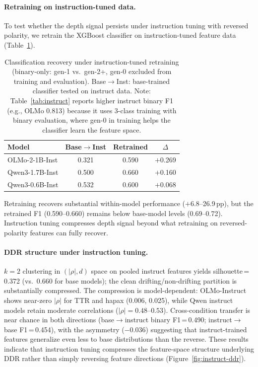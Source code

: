 \paragraph{Retraining on instruction-tuned data.}
To test whether the depth signal persists under instruction tuning with reversed polarity, we retrain the XGBoost classifier on instruction-tuned feature data (Table~\ref{tab:instruct-retrain}).

\begin{table}[ht]
\centering
\small
\caption{Classification recovery under instruction-tuned retraining (binary-only: gen-1 vs.\ gen-2+, gen-0 excluded from training and evaluation). Base$\rightarrow$Inst: base-trained classifier tested on instruct data. Note: Table~\ref{tab:instruct} reports higher instruct binary F1 (e.g., OLMo 0.813) because it uses 3-class training with binary evaluation, where gen-0 in training helps the classifier learn the feature space.}
\label{tab:instruct-retrain}
\begin{tabular}{lccc}
\toprule
\textbf{Model} & \textbf{Base$\rightarrow$Inst} & \textbf{Retrained} & \textbf{$\Delta$} \\
\midrule
OLMo-2-1B-Inst   & 0.321 & 0.590 & $+$0.269 \\
Qwen3-1.7B-Inst  & 0.500 & 0.660 & $+$0.160 \\
Qwen3-0.6B-Inst  & 0.532 & 0.600 & $+$0.068 \\
\bottomrule
\end{tabular}
\end{table}

Retraining recovers substantial within-model performance ($+$6.8--26.9\,pp), but the retrained F1 (0.590--0.660) remains below base-model levels (0.69--0.72). Instruction tuning compresses depth signal beyond what retraining on reversed-polarity features can fully recover.

\paragraph{DDR structure under instruction tuning.}
$k{=}2$ clustering in $(|\rho|, d)$ space on pooled instruct features yields silhouette\,=\,0.372 (vs.\ 0.660 for base models); the clean drifting/non-drifting partition is substantially compressed.
The compression is model-dependent: OLMo-Instruct shows near-zero $|\rho|$ for TTR and hapax (0.006, 0.025), while Qwen instruct models retain moderate correlations ($|\rho|{=}0.48$--$0.53$).
Cross-condition transfer is near chance in both directions (base$\rightarrow$instruct binary F1\,=\,0.490; instruct$\rightarrow$base F1\,=\,0.454), with the asymmetry ($-$0.036) suggesting that instruct-trained features generalize even less to base distributions than the reverse.
These results indicate that instruction tuning compresses the feature-space structure underlying DDR rather than simply reversing feature directions (Figure~\ref{fig:instruct-ddr}).

